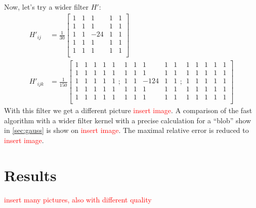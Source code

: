 \documentclass[reprint,amsmath,amssymb,aps,pre,showkeys,showpacs]{revtex4-1}
\begin{document}
Now, let's try a wider filter $H'$:
\begin{align}
  H'_{ij} &= \frac{1}{30} \left[
    \begin{array}{ccccc}
      1 & 1 & 1 & 1 & 1 \\
      1 & 1 & 1 & 1 & 1 \\
      1 & 1 & -24 & 1 & 1 \\
      1 & 1 & 1 & 1 & 1 \\
      1 & 1 & 1 & 1 & 1 \\
    \end{array}
    \right] \label{eq:filter-5x5-2d} \\
  H'_{ijk} &= \frac{1}{150} \left[
    \begin{array}{ccccc}
      1 & 1 & 1 & 1 & 1 \\
      1 & 1 & 1 & 1 & 1 \\
      1 & 1 & 1 & 1 & 1 \\
      1 & 1 & 1 & 1 & 1 \\
      1 & 1 & 1 & 1 & 1 \\
    \end{array} ;
    \begin{array}{ccccc}
      1 & 1 & 1 & 1 & 1 \\
      1 & 1 & 1 & 1 & 1 \\
      1 & 1 & -124 & 1 & 1 \\
      1 & 1 & 1 & 1 & 1 \\
      1 & 1 & 1 & 1 & 1 \\
    \end{array} ;
    \begin{array}{ccccc}
      1 & 1 & 1 & 1 & 1 \\
      1 & 1 & 1 & 1 & 1 \\
      1 & 1 & 1 & 1 & 1 \\
      1 & 1 & 1 & 1 & 1 \\
      1 & 1 & 1 & 1 & 1 \\
    \end{array}
    \right] \label{eq:filter-5x5-3d}
\end{align}
With this filter we get a different picture \textcolor{red}{insert image}. A
comparison of the fast algorithm with a wider filter kernel with a precise
calculation for a ``blob'' show in \cref{sec:gauss} is show on
\textcolor{red}{insert image}. The maximal relative error is reduced to
\textcolor{red}{insert image}.

\section{Results}
\textcolor{red}{insert many pictures, also with different quality}
\end{document}
